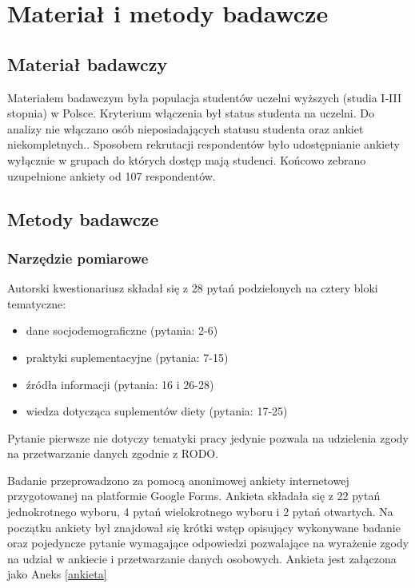 \section{Materiał i metody badawcze}\label{Materiał i metody badawcze}

\subsection{Materiał badawczy}

Materiałem badawczym była populacja studentów uczelni wyższych (studia I‐III stopnia) w Polsce. Kryterium włączenia był status studenta na uczelni. Do analizy nie włączano osób nieposiadających statusu studenta oraz ankiet niekompletnych.. Sposobem rekrutacji respondentów było udostępnianie ankiety wyłącznie w grupach do których dostęp mają studenci. Końcowo zebrano uzupełnione ankiety od 107 respondentów.

\subsection{Metody badawcze}

\subsubsection{Narzędzie pomiarowe}

Autorski kwestionariusz składał się z 28 pytań podzielonych na cztery bloki tematyczne:

\begin{itemize}
    \item dane socjodemograficzne (pytania: 2-6)
    \item praktyki suplementacyjne (pytania: 7-15)
    \item źródła informacji (pytania: 16 i 26-28)
    \item wiedza dotycząca suplementów diety (pytania: 17-25)
\end{itemize}

Pytanie pierwsze nie dotyczy tematyki pracy jedynie pozwala na udzielenia zgody na przetwarzanie danych zgodnie z RODO. 

Badanie przeprowadzono za pomocą anonimowej ankiety internetowej przygotowanej na platformie Google Forms. Ankieta składała się z 22 pytań jednokrotnego wyboru, 4 pytań wielokrotnego wyboru i 2 pytań otwartych. Na początku ankiety był znajdował się krótki wstęp opisujący wykonywane badanie oraz pojedyncze pytanie wymagające odpowiedzi pozwalające na wyrażenie zgody na udział w ankiecie i przetwarzanie danych osobowych. Ankieta jest załączona jako Aneks \ref{ankieta}

